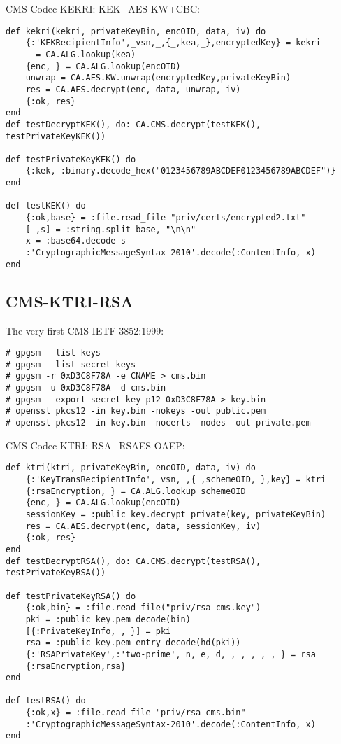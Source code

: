 CMS Codec KEKRI: KEK+AES-KW+CBC:

\begin{lstlisting}
def kekri(kekri, privateKeyBin, encOID, data, iv) do
    {:'KEKRecipientInfo',_vsn,_,{_,kea,_},encryptedKey} = kekri
    _ = CA.ALG.lookup(kea)
    {enc,_} = CA.ALG.lookup(encOID)
    unwrap = CA.AES.KW.unwrap(encryptedKey,privateKeyBin)
    res = CA.AES.decrypt(enc, data, unwrap, iv)
    {:ok, res}
end
def testDecryptKEK(), do: CA.CMS.decrypt(testKEK(), testPrivateKeyKEK())

def testPrivateKeyKEK() do
    {:kek, :binary.decode_hex("0123456789ABCDEF0123456789ABCDEF")}
end

def testKEK() do
    {:ok,base} = :file.read_file "priv/certs/encrypted2.txt"
    [_,s] = :string.split base, "\n\n"
    x = :base64.decode s
    :'CryptographicMessageSyntax-2010'.decode(:ContentInfo, x)
end
\end{lstlisting}

\newpage
\subsection{CMS-KTRI-RSA}

The very first CMS IETF 3852:1999:

\begin{lstlisting}
# gpgsm --list-keys
# gpgsm --list-secret-keys
# gpgsm -r 0xD3C8F78A -e CNAME > cms.bin
# gpgsm -u 0xD3C8F78A -d cms.bin
# gpgsm --export-secret-key-p12 0xD3C8F78A > key.bin
# openssl pkcs12 -in key.bin -nokeys -out public.pem
# openssl pkcs12 -in key.bin -nocerts -nodes -out private.pem
\end{lstlisting}

CMS Codec KTRI: RSA+RSAES-OAEP:

\begin{lstlisting}
def ktri(ktri, privateKeyBin, encOID, data, iv) do
    {:'KeyTransRecipientInfo',_vsn,_,{_,schemeOID,_},key} = ktri
    {:rsaEncryption,_} = CA.ALG.lookup schemeOID
    {enc,_} = CA.ALG.lookup(encOID)
    sessionKey = :public_key.decrypt_private(key, privateKeyBin)
    res = CA.AES.decrypt(enc, data, sessionKey, iv)
    {:ok, res}
end
def testDecryptRSA(), do: CA.CMS.decrypt(testRSA(), testPrivateKeyRSA())

def testPrivateKeyRSA() do
    {:ok,bin} = :file.read_file("priv/rsa-cms.key")
    pki = :public_key.pem_decode(bin)
    [{:PrivateKeyInfo,_,_}] = pki
    rsa = :public_key.pem_entry_decode(hd(pki))
    {:'RSAPrivateKey',:'two-prime',_n,_e,_d,_,_,_,_,_,_} = rsa
    {:rsaEncryption,rsa}
end

def testRSA() do
    {:ok,x} = :file.read_file "priv/rsa-cms.bin"
    :'CryptographicMessageSyntax-2010'.decode(:ContentInfo, x)
end
\end{lstlisting}

